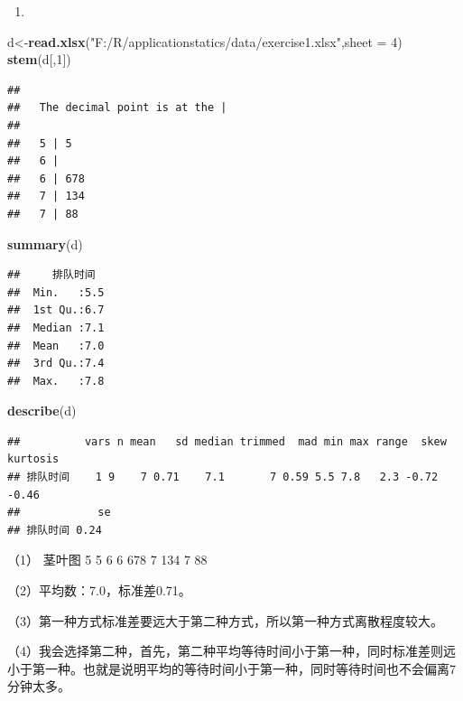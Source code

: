 \documentclass[]{article}
\newenvironment{Shaded}{\begin{snugshade}}{\end{snugshade}}
\newcommand{\KeywordTok}[1]{\textcolor[rgb]{0.13,0.29,0.53}{\textbf{#1}}}
\newcommand{\DataTypeTok}[1]{\textcolor[rgb]{0.13,0.29,0.53}{#1}}
\newcommand{\DecValTok}[1]{\textcolor[rgb]{0.00,0.00,0.81}{#1}}
\newcommand{\StringTok}[1]{\textcolor[rgb]{0.31,0.60,0.02}{#1}}
\newcommand{\NormalTok}[1]{#1}
\begin{document}
\begin{enumerate}
\def\labelenumi{\arabic{enumi}.}
\setcounter{enumi}{3}
\item
\end{enumerate}

\begin{Shaded}
\begin{Highlighting}[]
\NormalTok{d<-}\KeywordTok{read.xlsx}\NormalTok{(}\StringTok{"F:/R/applicationstatics/data/exercise1.xlsx"}\NormalTok{,}\DataTypeTok{sheet =} \DecValTok{4}\NormalTok{)}
\KeywordTok{stem}\NormalTok{(d[,}\DecValTok{1}\NormalTok{])}
\end{Highlighting}
\end{Shaded}

\begin{verbatim}
## 
##   The decimal point is at the |
## 
##   5 | 5
##   6 | 
##   6 | 678
##   7 | 134
##   7 | 88
\end{verbatim}

\begin{Shaded}
\begin{Highlighting}[]
\KeywordTok{summary}\NormalTok{(d)}
\end{Highlighting}
\end{Shaded}

\begin{verbatim}
##     排队时间  
##  Min.   :5.5  
##  1st Qu.:6.7  
##  Median :7.1  
##  Mean   :7.0  
##  3rd Qu.:7.4  
##  Max.   :7.8
\end{verbatim}

\begin{Shaded}
\begin{Highlighting}[]
\KeywordTok{describe}\NormalTok{(d)}
\end{Highlighting}
\end{Shaded}

\begin{verbatim}
##          vars n mean   sd median trimmed  mad min max range  skew kurtosis
## 排队时间    1 9    7 0.71    7.1       7 0.59 5.5 7.8   2.3 -0.72    -0.46
##            se
## 排队时间 0.24
\end{verbatim}

（1） 茎叶图 5 \textbar{} 5 6 \textbar{} 6 \textbar{} 678 7 \textbar{}
134 7 \textbar{} 88

（2）平均数：7.0，标准差0.71。

（3）第一种方式标准差要远大于第二种方式，所以第一种方式离散程度较大。

（4）我会选择第二种，首先，第二种平均等待时间小于第一种，同时标准差则远小于第一种。也就是说明平均的等待时间小于第一种，同时等待时间也不会偏离7分钟太多。
\end{document}
